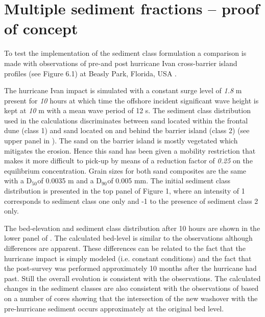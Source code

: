 \chapter{Multiple sediment fractions -- proof of concept}

To test the implementation of the sediment class formulation a comparison is made with observations of pre-and post hurricane Ivan cross-barrier island profiles (see Figure 6.1) at Beasly Park, Florida, USA \citep{WangHorwitz2007}. 

The hurricane Ivan impact is simulated with a constant surge level of \textit{1.8 }m present for \textit{10} hours at which time the offshore incident significant wave height is kept at \textit{10} m with a mean wave period of 12 s. The sediment class distribution used in the calculations discriminates between sand located within the frontal dune (class 1) and sand located on and behind the barrier island (class 2) (see upper panel in ). The sand on the barrier island is mostly vegetated which mitigates the erosion. Hence this sand has been given a mobility restriction that makes it more difficult to pick-up by means of a reduction factor of \textit{0.25} on the equilibrium concentration. Grain sizes for both sand composites are the same with a D${}_{50}$${}_{ }$of 0.0035 m and a D${}_{90}$${}_{ }$of 0.005 mm. The initial sediment class distribution is presented in the top panel of Figure 1, where an intensity of 1 corresponds to sediment class one only and -1 to the presence of sediment class 2 only.  

The bed-elevation and sediment class distribution after 10 hours are shown in the lower panel of . The calculated bed-level is similar to the observations although differences are apparent. These differences can be related to the fact that the hurricane impact is simply modeled (i.e. constant conditions) and the fact that the post-survey was performed approximately 10 months after the hurricane had past. Still the overall evolution is consistent with the observations. The calculated changes in the sediment classes are also consistent with the observations of \citet{WangHorwitz2007} based on a number of cores showing that the intersection of the new washover with the pre-hurricane sediment occurs approximately at the original bed level.

